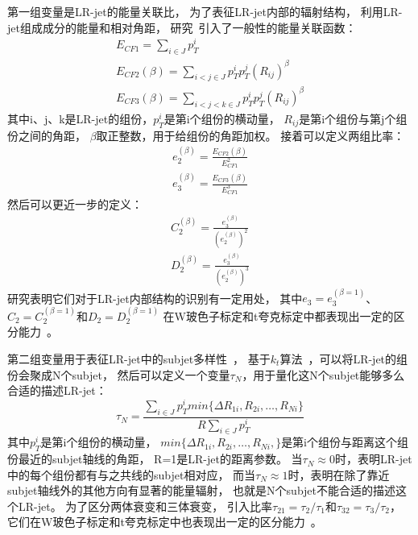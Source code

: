 第一组变量是LR-jet的能量关联比，
为了表征LR-jet内部的辐射结构，
利用LR-jet组成成分的能量和相对角距，
研究~\cite{JSS1,JSS2}引入了一般性的能量关联函数：
\begin{equation} 
\label{eq:JSS1}
 \begin{aligned}
E_{CF1}=\sum_{i\in J} p_{T}^i
\\
E_{CF2}(\beta)=\sum_{i<j\in J} p_T^i p_T^j (R_{ij})^\beta
 \\
E_{CF3}(\beta)=\sum_{i<j<k\in J} p_T^i p_T^j (R_{ij})^\beta
 \end{aligned}
\end{equation}
其中i、j、k是LR-jet的组份，$p_{T}^i$是第i个组份的横动量，
$R_{ij}$是第i个组份与第j个组份之间的角距，
$\beta$取正整数，用于给组份的角距加权。
接着可以定义两组比率：
\begin{equation} 
\label{eq:JSS2}
 \begin{aligned}
e_2^{(\beta)}=\frac{E_{CF2}(\beta)}{E_{CF1}^2}
\\
e_3^{(\beta)}=\frac{E_{CF3}(\beta)}{E_{CF1}^3}
 \end{aligned}
\end{equation}
然后可以更近一步的定义：
\begin{equation} 
\label{eq:JSS3}
 \begin{aligned}
C_2^{(\beta)}=\frac{e_3^{(\beta)}}{(e_2^{(\beta)})^2}
\\
D_2^{(\beta)}=\frac{e_3^{(\beta)}}{(e_2^{(\beta)})^3}
 \end{aligned}
\end{equation}
研究表明它们对于LR-jet内部结构的识别有一定用处，
其中$e_3=e_3^{(\beta=1)}$、$C_2=C_2^{(\beta=1)}$和$D_2=D_2^{(\beta=1)}$
在W玻色子标定和t夸克标定中都表现出一定的区分能力~\cite{JSCD2}。

第二组变量用于表征LR-jet中的subjet多样性~\cite{JSS3,JSS4}，
基于$k_t$算法~\cite{JSS14,JSTAU}，可以将LR-jet的组份会聚成N个subjet，
然后可以定义一个变量$\tau_N$，用于量化这N个subjet能够多么合适的描述LR-jet：
\begin{equation} 
\label{eq:JSS4}
\tau_N = \frac{ \sum_{i\in J} p_T^i min \{ \Delta R_{1i},R_{2i},\dots ,R_{Ni} \} }{R\sum_{i\in J} p_T^i}
\end{equation}
其中$p_T^i$是第i个组份的横动量，
$min \{ \Delta R_{1i},R_{2i},\dots ,R_{Ni}, \}$是第i个组份与距离这个组份最近的subjet轴线的角距，
R=1是LR-jet的距离参数。
当$\tau_N \approx 0$时，表明LR-jet中的每个组份都有与之共线的subjet相对应，
而当$\tau_N \approx 1$时，表明在除了靠近subjet轴线外的其他方向有显著的能量辐射，
也就是N个subjet不能合适的描述这个LR-jet。
为了区分两体衰变和三体衰变，
引入比率$\tau_{21}=\tau_2/\tau_1$和$\tau_{32}=\tau_3/\tau_2$，
它们在W玻色子标定和t夸克标定中也表现出一定的区分能力~\cite{JSS3}。


